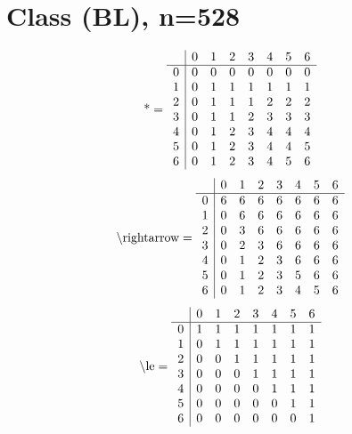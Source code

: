 \documentclass[11pt]{article}
\begin{document}
\section{Class (BL), n=528}
\[\text{*} = 
\begin{array}{r | r r r r r r r}
 & 0 & 1 & 2 & 3 & 4 & 5 & 6 \\ \hline
0 & 0 & 0 & 0 & 0 & 0 & 0 & 0 \\
1 & 0 & 1 & 1 & 1 & 1 & 1 & 1 \\
2 & 0 & 1 & 1 & 1 & 2 & 2 & 2 \\
3 & 0 & 1 & 1 & 2 & 3 & 3 & 3 \\
4 & 0 & 1 & 2 & 3 & 4 & 4 & 4 \\
5 & 0 & 1 & 2 & 3 & 4 & 4 & 5 \\
6 & 0 & 1 & 2 & 3 & 4 & 5 & 6 \\
\end{array}
\]
\[\text{\textbackslash rightarrow} = 
\begin{array}{r | r r r r r r r}
 & 0 & 1 & 2 & 3 & 4 & 5 & 6 \\ \hline
0 & 6 & 6 & 6 & 6 & 6 & 6 & 6 \\
1 & 0 & 6 & 6 & 6 & 6 & 6 & 6 \\
2 & 0 & 3 & 6 & 6 & 6 & 6 & 6 \\
3 & 0 & 2 & 3 & 6 & 6 & 6 & 6 \\
4 & 0 & 1 & 2 & 3 & 6 & 6 & 6 \\
5 & 0 & 1 & 2 & 3 & 5 & 6 & 6 \\
6 & 0 & 1 & 2 & 3 & 4 & 5 & 6 \\
\end{array}
\]
\[\text{\textbackslash le} = 
\begin{array}{r | r r r r r r r}
 & 0 & 1 & 2 & 3 & 4 & 5 & 6 \\ \hline
0 & 1 & 1 & 1 & 1 & 1 & 1 & 1 \\
1 & 0 & 1 & 1 & 1 & 1 & 1 & 1 \\
2 & 0 & 0 & 1 & 1 & 1 & 1 & 1 \\
3 & 0 & 0 & 0 & 1 & 1 & 1 & 1 \\
4 & 0 & 0 & 0 & 0 & 1 & 1 & 1 \\
5 & 0 & 0 & 0 & 0 & 0 & 1 & 1 \\
6 & 0 & 0 & 0 & 0 & 0 & 0 & 1 \\
\end{array}
\]
\end{document}
